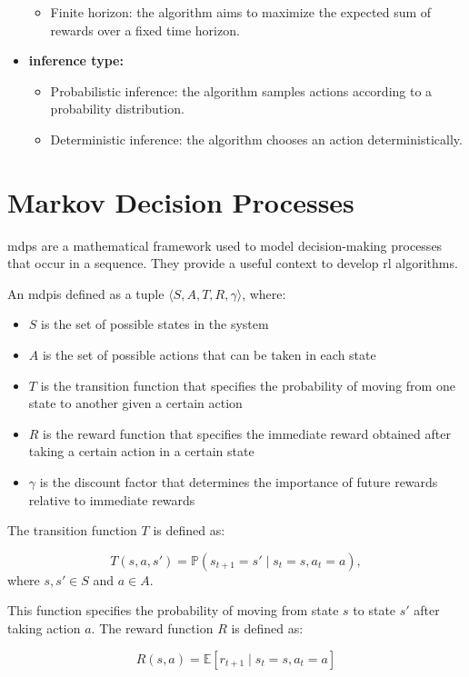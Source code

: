 \begin{minipage}{\textwidth}
\begin{itemize}
\begin{itemize}
    \item Finite horizon: the algorithm aims to maximize the expected sum of rewards over a fixed time horizon.
    \end{itemize}
    \item \textbf{inference type:}
    \begin{itemize}
    \item Probabilistic inference: the algorithm samples actions according to a probability distribution.
    \item Deterministic inference: the algorithm chooses an action deterministically.
    \end{itemize}
    \end{itemize}
\end{minipage}

\section{Markov Decision Processes}
\ac{mdp}s are a mathematical framework used to model decision-making processes that occur in a sequence. They provide a useful 
context to develop \ac{rl} algorithms.

An \ac{mdp}is defined as a tuple $\langle S, A, T, R, \gamma \rangle$, where:
\begin{itemize}
    \item $S$ is the set of possible states in the system
    \item $A$ is the set of possible actions that can be taken in each state
    \item $T$ is the transition function that specifies the probability of moving from one state to another given a certain action
    \item $R$ is the reward function that specifies the immediate reward obtained after taking a certain action in a certain state
    \item $\gamma$ is the discount factor that determines the importance of future rewards relative to immediate rewards
\end{itemize}

The transition function $T$ is defined as:

$$T(s, a, s') = \mathbb{P}(s_{t+1}=s' \mid s_t=s, a_t=a),$$
where $s, s' \in S$ and $a \in A$.

This function specifies the probability of moving from state $s$ to state $s'$ after taking action $a$. The reward function $R$ is defined as:

$$R(s, a) = \mathbb{E}[r_{t+1} \mid s_t=s, a_t=a]$$


